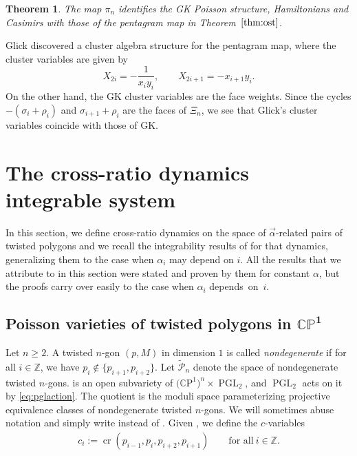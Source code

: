 \documentclass[pdftex]{sigma}
\numberwithin{equation}{section}
\newtheorem{Theorem}{Theorem}[section]
\newcommand{\Z}{{\mathbb Z}}
\newcommand{\C}{{\mathbb C}}
\newcommand{\CP}{{\mathbb C\mathrm P}}
\renewcommand{\P}{{\mathbb P}}
\newcommand{\PGL}{\operatorname{PGL}}
\newcommand{\la}{\label}
\def\cro{\operatorname{cr}}
\begin{document}
	\begin{Theorem}\la{mainthm:pentagram}
		The map $\pi_n$ identifies the GK Poisson structure, Hamiltonians and Casimirs with those of the pentagram map in Theorem~$\ref{thm:ost}$.
	\end{Theorem}
	\begin{Remark}
		Glick \cite{Glick} discovered a cluster algebra structure for the pentagram map, where the cluster variables are given by
		\[
		X_{2i}=-\frac{1}{x_i y_i}, \qquad X_{2i+1}= -x_{i+1} y_{i}.
		\]
		On the other hand, the GK cluster variables are the face weights. Since the cycles $-(\sigma_i+\rho_i)$ and $\sigma_{i+1}+\rho_i$ are the faces of $\Xi_n$, we see that Glick's cluster variables coincide with those of GK.
	\end{Remark}
	
	\section{The cross-ratio dynamics integrable system}
	\label{sec:crdynamics}
	
	In this section, we define cross-ratio dynamics on the space of $\vec{\alpha}$-related pairs of twisted polygons and we recall the integrability results of \cite{AFIT} for that dynamics, generalizing them to the case when $\alpha_i$ may depend on $i$. All the results that we attribute to \cite{AFIT} in this section were stated and proven by them for constant $\alpha$, but the proofs carry over easily to the case when $\alpha_i$ depends~on~$i$.
	
	\subsection[Poisson varieties of twisted polygons in C P\^{}1]{Poisson varieties of twisted polygons in $\boldsymbol{\C \P^1}$}
	
	Let $n\geq2$. A twisted $n$-gon $(p,M)$ in dimension $1$ is called \emph{nondegenerate} if for all $i \in \Z$, we have $p_i \notin \{p_{i+1},p_{i+2}\}$. Let $\widetilde {\mathcal P}_n$ denote the space of nondegenerate twisted $n$-gons.  is an open subvariety of $\big(\CP^1\big)^n \times \PGL_2$, and $\PGL_2$ acts on it by \eqref{eq:pglaction}. The quotient \smash{$\mathcal P_n:=\widetilde{\mathcal P}_n / \PGL_2$} is the moduli space parameterizing projective equivalence classes of nondegenerate twisted $n$-gons. We will sometimes abuse notation and simply write  instead of . Given , we define the $c$-variables
	\begin{align}\la{def:c}
		c_i := \cro(p_{i-1},p_i,p_{i+2},p_{i+1}) \qquad \text{for all}\ i \in \Z.
	\end{align}
	
\end{document}
